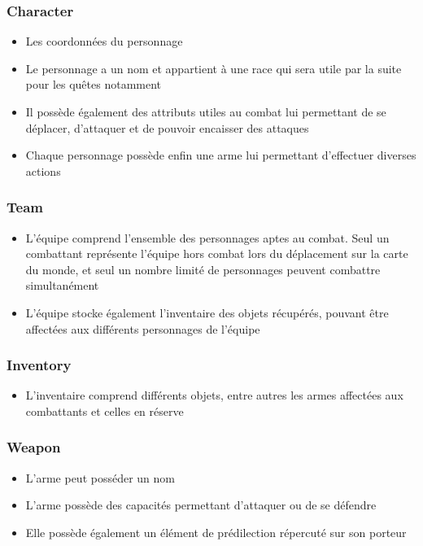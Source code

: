\documentclass[a4paper,12pt]{article}
\begin{document}
\subsubsection{Character}
\begin{itemize}
\item Les coordonnées du personnage
\item Le personnage a un nom et appartient à une race qui sera utile par la suite pour les quêtes notamment
\item Il possède également des attributs utiles au combat lui permettant de se déplacer, d'attaquer et de pouvoir encaisser des attaques
\item Chaque personnage possède enfin une arme lui permettant d'effectuer diverses actions
\end{itemize}

\subsubsection{Team}
\begin{itemize}
\item L'équipe comprend l'ensemble des personnages aptes au combat. Seul un combattant représente l'équipe hors combat lors du déplacement sur la carte du monde, et seul un nombre limité de personnages peuvent combattre simultanément
\item L'équipe stocke également l'inventaire des objets récupérés, pouvant être affectées aux différents personnages de l'équipe
\end{itemize}

\subsubsection{Inventory}
\begin{itemize}
\item L'inventaire comprend différents objets, entre autres les armes affectées aux combattants et celles en réserve
\end{itemize}

\subsubsection{Weapon}
\begin{itemize}
\item L'arme peut posséder un nom
\item L'arme possède des capacités permettant d'attaquer ou de se défendre
\item Elle possède également un élément de prédilection répercuté sur son porteur
\end{itemize}
\end{document}
